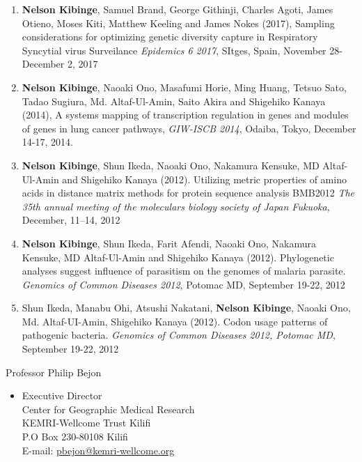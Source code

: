 \documentclass[10pt]{article}
\makeatletter
\newlength{\bibhang}
\newlength{\bibsep}
{\@listi \global\bibsep\itemsep \global\advance\bibsep by\parsep}
\newenvironment{bibsection}%
{\begin{enumerate}{}{%
			\setlength{\leftmargin}{\bibhang}%
			\setlength{\itemindent}{-\leftmargin}%
			\setlength{\itemsep}{\bibsep}%
			\setlength{\parsep}{\z@}%
			\setlength{\partopsep}{0pt}%
			\setlength{\topsep}{0pt}}}
	{\end{enumerate}\vspace{-.6\baselineskip}}
\renewcommand{\section}[1]{\pagebreak[3]%
	\hyphenpenalty=10000%
	\vspace{1.3\baselineskip}%
	\phantomsection\addcontentsline{toc}{section}{#1}%
	\noindent\llap{\scshape\smash{\parbox[t]{\marginparwidth}{\raggedright\textcolor{black}{#1}}}}%
	\vspace{-\baselineskip}\par}
\newenvironment{innerlist}[1][\enskip\textbullet]%
{\begin{itemize}[#1,leftmargin=*,parsep=0pt,itemsep=0pt,topsep=0pt,partopsep=0pt]}
	{\end{itemize}}
\makeatother
\begin{document}
\begin{bibsection}
	

\item \textbf{Nelson Kibinge}, Samuel Brand, George Githinji, Charles Agoti, James Otieno, Moses Kiti, Matthew Keeling and James Nokes (2017), Sampling considerations for optimizing genetic diversity capture in Respiratory Syncytial virus Surveilance \textit{Epidemics 6 2017}, SItges, Spain, November 28-December 2, 2017
	
	
	\item \textbf{Nelson Kibinge}, Naoaki Ono, Masafumi Horie, Ming Huang, Tetsuo Sato, Tadao Sugiura, Md. Altaf-Ul-Amin, Saito Akira and Shigehiko Kanaya (2014), A systems mapping of transcription regulation in genes and modules of genes in lung cancer pathways, \textit{GIW-ISCB 2014}, Odaiba, Tokyo, December 14-17, 2014.
	
	\item \textbf{Nelson Kibinge}, Shun Ikeda, Naoaki Ono, Nakamura Kensuke, MD Altaf-Ul-Amin and Shigehiko Kanaya (2012). Utilizing metric properties of amino acids in distance matrix methods for protein sequence analysis BMB2012 \textit{The 35th annual meeting of the moleculars biology society of Japan Fukuoka}, December, 11–14, 2012
	
	\item \textbf{Nelson Kibinge}, Shun Ikeda, Farit Afendi, Naoaki Ono, Nakamura Kensuke, MD Altaf-Ul-Amin and Shigehiko Kanaya (2012). Phylogenetic analyses suggest influence of parasitism on the genomes of malaria parasite. \textit{Genomics of Common Diseases 2012}, Potomac MD, September 19-22, 2012
	
	\item Shun Ikeda, Manabu Ohi, Atsushi Nakatani, \textbf{Nelson Kibinge}, Naoaki Ono, Md. Altaf-UI-Amin, Shigehiko Kanaya (2012). Codon usage patterns of pathogenic bacteria. \textit{Genomics of Common Diseases 2012, Potomac MD}, September 19-22, 2012
\end{bibsection}%



\newpage
\section{Referees}



Professor Philip Bejon
\begin{innerlist}
\item [] Executive Director\\
Center for Geographic Medical Research\\
KEMRI-Wellcome Trust Kilifi\\
P.O Box 230-80108 Kilifi\\
E-mail: \href{mailto:pbejon@kemri-wellcome.org}{pbejon@kemri-wellcome.org}
\end{innerlist}
\end{document}
